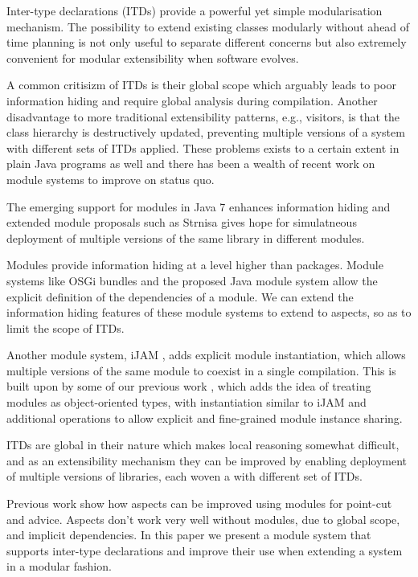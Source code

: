 
Inter-type declarations (ITDs) provide a powerful yet simple modularisation
mechanism. The possibility to extend existing classes modularly without
ahead of time planning is not only useful to separate different concerns
but also extremely convenient for modular extensibility when software
evolves.

A common critisizm of ITDs is their global scope which arguably leads to
poor information hiding and require global analysis during compilation.
Another disadvantage to more traditional extensibility patterns, e.g.,
visitors, is that the class hierarchy is destructively updated, preventing
multiple versions of a system with different sets of ITDs applied.
These problems exists to a certain extent in plain Java programs as well
and there has been a wealth of recent work on module systems to improve on
status quo. 

The emerging support for modules in Java 7 enhances information hiding and
extended module proposals such as Strnisa gives hope for simulatneous
deployment of multiple versions of the same library in different modules.

Modules provide information hiding at a level higher than packages. Module
systems like OSGi bundles\cite{OSGi4} and the proposed Java module system\cite{JSR277}
allow the explicit definition of the dependencies of a module. We can extend
the information hiding features of these module systems to extend to aspects, 
so as to limit the scope of ITDs.

Another module system, iJAM \cite{iJAM}, adds explicit module instantiation, 
which allows multiple versions of the same module to coexist in a single compilation.
This is built upon by some of our previous work \cite{modulesastypes}, which 
adds the idea of treating modules as object-oriented types, with instantiation
similar to iJAM and additional operations to allow explicit and fine-grained
module instance sharing. 

ITDs are global in their nature which makes local
reasoning somewhat difficult, and as an extensibility mechanism they can be
improved by enabling deployment of multiple versions of libraries, 
each woven a with different set of ITDs.


Previous work show how aspects can be improved using modules for point-cut
and advice.
Aspects don't work very well without modules, due to global scope, and
implicit dependencies.
In this paper we present a module system that supports inter-type
declarations and improve their use when extending a system in a modular
fashion.

